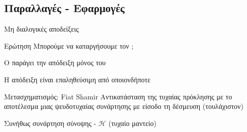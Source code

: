 \documentclass[handout]{beamer}
\begin{document}

\subsection{Παραλλαγές - Εφαρμογές}
\begin{frame}{Μη διαλογικές αποδείξεις}
\begin{block}{Ερώτηση}
Μπορούμε να καταργήσουμε τον \ver ;
\end{block}

O \prv παράγει την απόδειξη μόνος του

Η απόδειξη είναι επαληθεύσιμη από οποιονδήποτε

\begin{block}{Μετασχηματισμός: Fiat Shamir}
Αντικατάσταση της τυχαίας πρόκλησης με το αποτέλεσμα μιας ψευδοτυχαίας συνάρτησης με είσοδο τη δέσμευση (τουλάχιστον)

Συνήθως συνάρτηση σύνοψης - $\mathcal{H}$ (τυχαίο μαντείο)
\end{block}
\end{frame}
\end{document}
